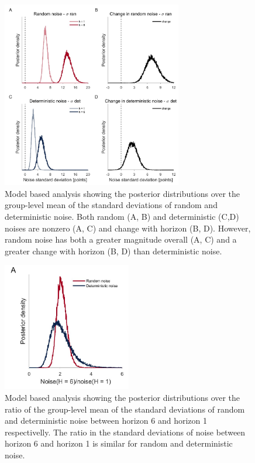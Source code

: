 \documentclass[12pt]{article}
\begin{document}
{\begin{figure}[H]
\begin{center}
	\includegraphics[width=0.7\textwidth]{figures/RDBayes_hyperprior.jpg}
	\caption{Model based analysis showing the posterior distributions over the group-level mean of the standard deviations of  random and deterministic noise. Both random (A, B) and deterministic (C,D) noises are nonzero (A, C) and change with horizon (B, D).  However, random noise has both a greater magnitude overall (A, C) and a greater change with horizon (B, D) than deterministic noise.}
	\label{fig:mb1}
\end{center}
\end{figure}

\begin{figure}[H]
\begin{center}
	\includegraphics[width=0.5\textwidth]{figures/RDBayes_ratio__paironly.jpg}
	\caption{Model based analysis showing the posterior distributions over the ratio of the group-level mean of the standard deviations of  random and deterministic noise between horizon 6 and horizon 1 respectivelly. The ratio in the standard deviations of noise between horizon 6 and horizon 1 is similar for random and deterministic noise.}
	\label{fig:ratio}
\end{center}
\end{figure}

}
\end{document}
